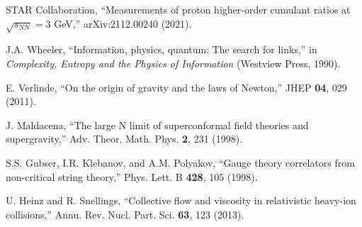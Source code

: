\documentclass[12pt,a4paper]{article}
\begin{document}
\begin{thebibliography}{99}
STAR Collaboration, ``Measurements of proton higher-order cumulant ratios at $\sqrt{s_{NN}} = 3$ GeV,'' arXiv:2112.00240 (2021).

J.A. Wheeler, ``Information, physics, quantum: The search for links,'' in \textit{Complexity, Entropy and the Physics of Information} (Westview Press, 1990).

E. Verlinde, ``On the origin of gravity and the laws of Newton,'' JHEP \textbf{04}, 029 (2011).

J. Maldacena, ``The large N limit of superconformal field theories and supergravity,'' Adv. Theor. Math. Phys. \textbf{2}, 231 (1998).

S.S. Gubser, I.R. Klebanov, and A.M. Polyakov, ``Gauge theory correlators from non-critical string theory,'' Phys. Lett. B \textbf{428}, 105 (1998).

U. Heinz and R. Snellings, ``Collective flow and viscosity in relativistic heavy-ion collisions,'' Annu. Rev. Nucl. Part. Sci. \textbf{63}, 123 (2013).

\end{thebibliography}
\end{document}
